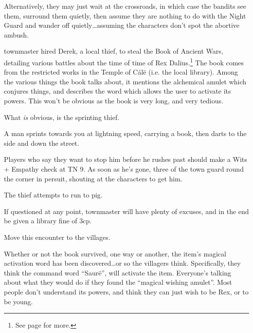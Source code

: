 \begin{multicols}{2}
Alternatively, they may just wait at the crossroads, in which case the bandits see them, surround them quietly, then assume they are nothing to do with the Night Guard and wander off quietly\ldots assuming the characters don't spot the abortive ambush.

\vfill\null


\Gls{townmaster} hired Derek, a local thief, to steal the Book of Ancient Wars, detailing various battles about the time of time of Rex Dalius.\footnote{See page \pageref{h_dalius} for more.}
The book comes from the restricted works in the Temple of C\'{a}l\"{e} (i.e. the local library).
Among the various things the book talks about, it mentions the alchemical amulet which conjures things, and describes the word which allows the user to activate its powers.
This won't be obvious as the book is very long, and very tedious.

What \emph{is} obvious, is the sprinting thief.

\begin{boxtext}

	A man sprints towards you at lightning speed, carrying a book, then darts to the side and down the street.

\end{boxtext}

Players who say they want to stop him before he rushes past should make a Wits + Empathy check at TN 9.  As soon as he's gone, three of the town guard round the corner in persuit, shouting at the characters to get him.

The thief attempts to run to \gls{pig}.

If questioned at any point, \gls{townmaster} will have plenty of excuses, and in the end be given a library fine of 3cp.

Move this encounter to the villages.


Whether or not the book survived, one way or another, the item's magical activation word has been discovered\ldots or so the villagers think.
Specifically, they think the command word ``Saur\"{e}'', will activate the item.
Everyone's talking about what they would do if they found the ``magical wishing amulet''.
Most people don't understand its powers, and think they can just wish to be Rex, or to be young.


\end{multicols}
